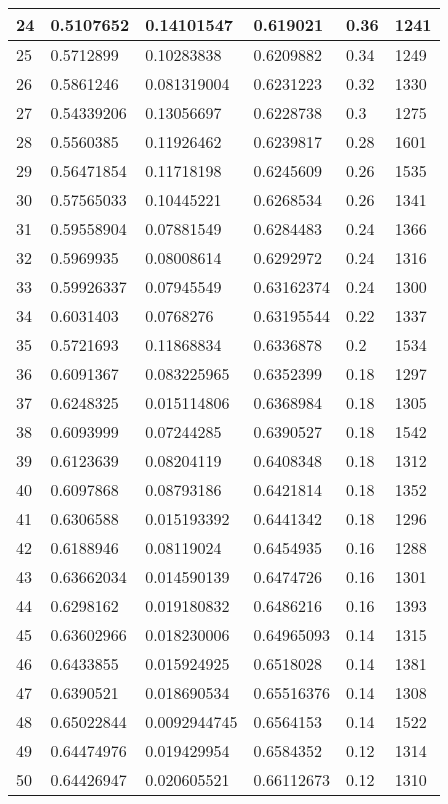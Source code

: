 \begin{longtable}{|l|l|l|l|l|l|}
24 & 0.5107652 & 0.14101547 & 0.619021 & 0.36 & 1241 \\ \hline 
25 & 0.5712899 & 0.10283838 & 0.6209882 & 0.34 & 1249 \\ \hline 
26 & 0.5861246 & 0.081319004 & 0.6231223 & 0.32 & 1330 \\ \hline 
27 & 0.54339206 & 0.13056697 & 0.6228738 & 0.3 & 1275 \\ \hline 
28 & 0.5560385 & 0.11926462 & 0.6239817 & 0.28 & 1601 \\ \hline 
29 & 0.56471854 & 0.11718198 & 0.6245609 & 0.26 & 1535 \\ \hline 
30 & 0.57565033 & 0.10445221 & 0.6268534 & 0.26 & 1341 \\ \hline 
31 & 0.59558904 & 0.07881549 & 0.6284483 & 0.24 & 1366 \\ \hline 
32 & 0.5969935 & 0.08008614 & 0.6292972 & 0.24 & 1316 \\ \hline 
33 & 0.59926337 & 0.07945549 & 0.63162374 & 0.24 & 1300 \\ \hline 
34 & 0.6031403 & 0.0768276 & 0.63195544 & 0.22 & 1337 \\ \hline 
35 & 0.5721693 & 0.11868834 & 0.6336878 & 0.2 & 1534 \\ \hline 
36 & 0.6091367 & 0.083225965 & 0.6352399 & 0.18 & 1297 \\ \hline 
37 & 0.6248325 & 0.015114806 & 0.6368984 & 0.18 & 1305 \\ \hline 
38 & 0.6093999 & 0.07244285 & 0.6390527 & 0.18 & 1542 \\ \hline 
39 & 0.6123639 & 0.08204119 & 0.6408348 & 0.18 & 1312 \\ \hline 
40 & 0.6097868 & 0.08793186 & 0.6421814 & 0.18 & 1352 \\ \hline 
41 & 0.6306588 & 0.015193392 & 0.6441342 & 0.18 & 1296 \\ \hline 
42 & 0.6188946 & 0.08119024 & 0.6454935 & 0.16 & 1288 \\ \hline 
43 & 0.63662034 & 0.014590139 & 0.6474726 & 0.16 & 1301 \\ \hline 
44 & 0.6298162 & 0.019180832 & 0.6486216 & 0.16 & 1393 \\ \hline 
45 & 0.63602966 & 0.018230006 & 0.64965093 & 0.14 & 1315 \\ \hline 
46 & 0.6433855 & 0.015924925 & 0.6518028 & 0.14 & 1381 \\ \hline 
47 & 0.6390521 & 0.018690534 & 0.65516376 & 0.14 & 1308 \\ \hline 
48 & 0.65022844 & 0.0092944745 & 0.6564153 & 0.14 & 1522 \\ \hline 
49 & 0.64474976 & 0.019429954 & 0.6584352 & 0.12 & 1314 \\ \hline 
50 & 0.64426947 & 0.020605521 & 0.66112673 & 0.12 & 1310 \\ \hline 
\end{longtable}
